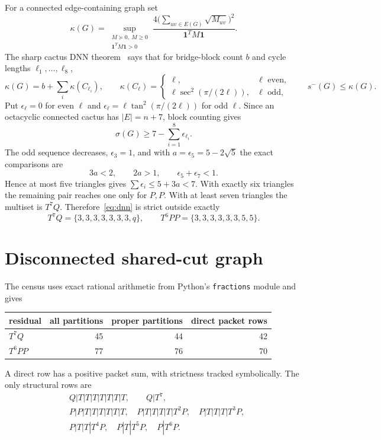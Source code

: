 \documentclass[11pt]{article}
\newcommand{\smE}{s^-}
\newcommand{\sig}{\sigma}
\newcommand{\one}{\mathbf 1}
\begin{document}
For a connected edge-containing graph set
\[
 \kappa(G)=\sup_{\substack{M\succeq0,\ M\geq0\\\one^TM\one>0}}
 \frac{4\bigl(\sum_{uv\in E(G)}\sqrt{M_{uv}}\bigr)^2}{\one^TM\one}.
\]
The sharp cactus DNN theorem~\cite{DNN,LTZ} says that for bridge-block count
$b$ and cycle lengths $\ell_1,\ldots,\ell_8$,
\[
 \kappa(G)=b+\sum_i\kappa(C_{\ell_i}),\qquad
 \kappa(C_\ell)=\begin{cases}
  \ell,&\ell\text{ even},\\
  \ell\sec^2(\pi/(2\ell)),&\ell\text{ odd},
 \end{cases}
 \qquad \smE(G)\leq\kappa(G).
\]
Put $\epsilon_\ell=0$ for even $\ell$ and
$\epsilon_\ell=\ell\tan^2(\pi/(2\ell))$ for odd $\ell$.  Since an
octacyclic connected cactus has $|E|=n+7$, block counting gives
\begin{equation}\label{eq:dnn}
 \sig(G)\geq7-\sum_{i=1}^8\epsilon_{\ell_i}.
\end{equation}
The odd sequence decreases, $\epsilon_3=1$, and with
$a=\epsilon_5=5-2\sqrt5$ the exact comparisons are
\[
 3a<2,\qquad2a>1,\qquad\epsilon_5+\epsilon_7<1.
\]
Hence at most five triangles gives
$\sum\epsilon_i\leq5+3a<7$.  With exactly six triangles the remaining pair
reaches one only for $P,P$.  With at least seven triangles the multiset is
$T^7Q$.  Therefore~\eqref{eq:dnn} is strict outside exactly
\begin{equation}\label{eq:residuals}
 T^7Q=\{3,3,3,3,3,3,3,q\},\qquad
 T^6PP=\{3,3,3,3,3,3,5,5\}.
\end{equation}

\section{Disconnected shared-cut graph}

The census uses exact rational arithmetic from Python's \texttt{fractions}
module and gives
\begin{center}
\begin{tabular}{lrrr}
\toprule
residual & all partitions & proper partitions & direct packet rows\\
\midrule
$T^7Q$  &45&44&42\\
$T^6PP$ &77&76&70\\
\bottomrule
\end{tabular}
\end{center}
A direct row has a positive packet sum, with strictness tracked symbolically.
The only structural rows are
\begin{align}
 &Q|T|T|T|T|T|T|T,\qquad Q|T^7,\label{eq:t7rows}\\
 &P|P|T|T|T|T|T|T,\quad P|T|T|T|T|T^2P,\quad
 P|T|T|T|T^3P,\nonumber\\
 &P|T|T|T^4P,\quad P|T|T^5P,\quad P|T^6P.\label{eq:t6rows}
\end{align}
\end{document}
